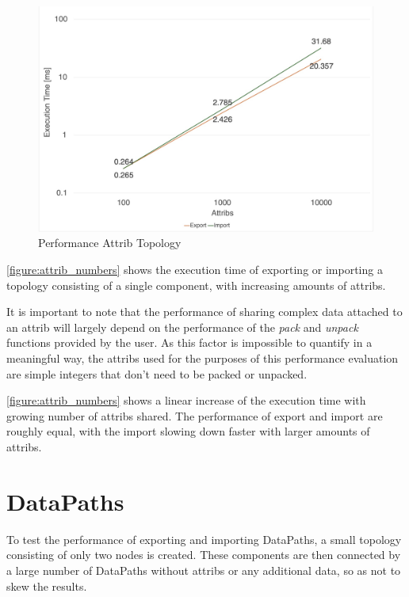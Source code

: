\begin{figure}[ht]
    \includegraphics[scale=0.26]{images/attrib_numbers.jpeg}
    \centering
    \caption{Performance Attrib Topology}
    \label{figure:attrib_numbers}
\end{figure}

\autoref{figure:attrib_numbers} shows the execution time of exporting or importing a topology consisting of a single component, with increasing amounts of attribs.

It is important to note that the performance of sharing complex data attached to an attrib will largely depend on the performance of the \emph{pack} and \emph{unpack} functions provided by the user.
As this factor is impossible to quantify in a meaningful way, the attribs used for the purposes of this performance evaluation are simple integers that don't need to be packed or unpacked.

\autoref{figure:attrib_numbers} shows a linear increase of the execution time with growing number of attribs shared. The performance of export and import are roughly equal, with the import slowing down faster with larger amounts of attribs.

\section{DataPaths}
To test the performance of exporting and importing DataPaths, a small topology consisting of only two nodes is created.
These components are then connected by a large number of DataPaths without attribs or any additional data, so as not to skew the results.

